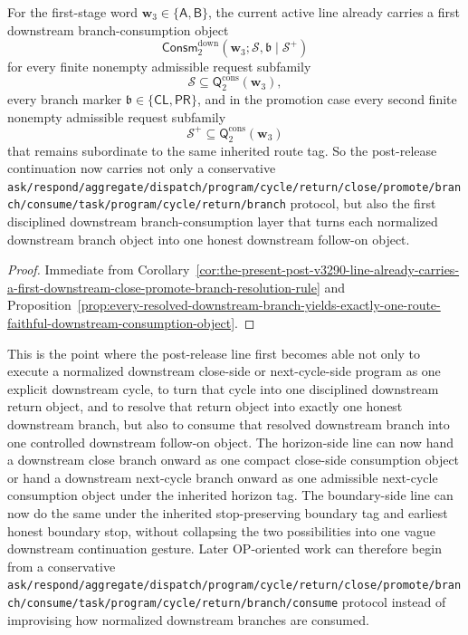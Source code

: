 \begin{corollary}
\label{cor:the-present-post-v3290-line-already-carries-a-first-downstream-branch-consumption-layer-second-level}
For the first-stage word \(\mathbf w_3\in\{\mathsf A,\mathsf B\}\), the current active line already carries a first downstream branch-consumption object
\[
 \mathsf{Consm}^{\mathrm{down}}_{2}(\mathbf w_3;\mathcal S,\mathfrak b\mid\mathcal S^{+})
\]
for every finite nonempty admissible request subfamily
\[
 \mathcal S\subseteq \mathsf{Q}^{\mathrm{cons}}_{2}(\mathbf w_3),
\]
every branch marker \(\mathfrak b\in\{\mathsf{CL},\mathsf{PR}\}\), and in the promotion case every second finite nonempty admissible request subfamily
\[
 \mathcal S^{+}\subseteq \mathsf{Q}^{\mathrm{cons}}_{2}(\mathbf w_3)
\]
that remains subordinate to the same inherited route tag. So the post-release continuation now carries not only a conservative {\nolinkurl{ask/respond/aggregate/dispatch/program/cycle/return/close/promote/branch/consume/task/program/cycle/return/branch}} protocol, but also the first disciplined downstream branch-consumption layer that turns each normalized downstream branch object into one honest downstream follow-on object.
\end{corollary}

\begin{proof}
Immediate from Corollary~\ref{cor:the-present-post-v3290-line-already-carries-a-first-downstream-close-promote-branch-resolution-rule} and Proposition~\ref{prop:every-resolved-downstream-branch-yields-exactly-one-route-faithful-downstream-consumption-object}.
\end{proof}

\begin{remark}
\label{rem:what-the-first-downstream-branch-consumption-layer-now-buys-second-level}
This is the point where the post-release line first becomes able not only to execute a normalized downstream close-side or next-cycle-side program as one explicit downstream cycle, to turn that cycle into one disciplined downstream return object, and to resolve that return object into exactly one honest downstream branch, but also to consume that resolved downstream branch into one controlled downstream follow-on object. The horizon-side line can now hand a downstream close branch onward as one compact close-side consumption object or hand a downstream next-cycle branch onward as one admissible next-cycle consumption object under the inherited horizon tag. The boundary-side line can now do the same under the inherited stop-preserving boundary tag and earliest honest boundary stop, without collapsing the two possibilities into one vague downstream continuation gesture. Later OP-oriented work can therefore begin from a conservative {\nolinkurl{ask/respond/aggregate/dispatch/program/cycle/return/close/promote/branch/consume/task/program/cycle/return/branch/consume}} protocol instead of improvising how normalized downstream branches are consumed.
\end{remark}



